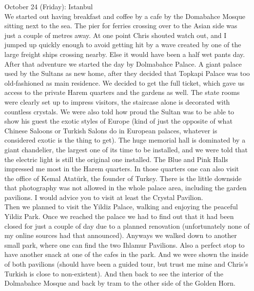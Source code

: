 October 24 (Friday): Istanbul\\
We started out having breakfast and coffee by a cafe by the Domabahce Mosque sitting next to the sea. The pier for ferries crossing over to the Asian side was just a couple of metres away. At one point Chris shouted watch out, and I jumped up quickly enough to avoid getting hit by a wave created by one of the large freight ships crossing nearby. Else it would have been a half wet pants day. After that adventure we started the day by Dolmabahce Palace. A giant palace used by the Sultans as new home, after they decided that Topkapi Palace was too old-fashioned as main residence. We decided to get the full ticket, which gave us access to the private Harem quarters and the gardens as well. The state rooms were clearly set up to impress visitors, the staircase alone is decorated with countless crystals. We were also told how proud the Sultan was to be able to show his guest the exotic styles of Europe (kind of just the opposite of what Chinese Saloons or Turkish Salons do in European palaces, whatever is considered exotic is the thing to get). The huge memorial hall is dominated by a giant chandelier, the largest one of its time to be installed, and we were told that the electric light is still the original one installed. The Blue and Pink Halls impressed me most in the Harem quarters. In those quarters one can also visit the office of Kemal Atat\"urk, the founder of Turkey. There is the little downside that photography was not allowed in the whole palace area, including the garden pavilions. I would advice you to visit at least the Crystal Pavilion.\\
Then we planned to visit the Yildiz Palace, walking and enjoying the peaceful Yildiz Park. Once we reached the palace we had to find out that it had been closed for just a couple of day due to a planned renovation (unfortunately none of my online sources had that announced). Anyways we walked down to another small park, where one can find the two Ihlamur Pavilions. Also a perfect stop to have another snack at one of the cafes in the park. And we were shown the inside of both pavilions (should have been a guided tour, but trust me mine and Chris's Turkish is close to non-existent). And then back to see the interior of the Dolmabahce Mosque and back by tram to the other side of the Golden Horn.\\
